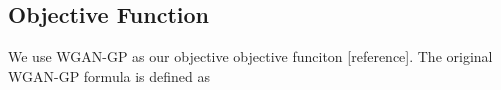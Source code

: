 \subsection{Objective Function}
We use WGAN-GP as our objective objective funciton [reference]. The original WGAN-GP formula is defined as 